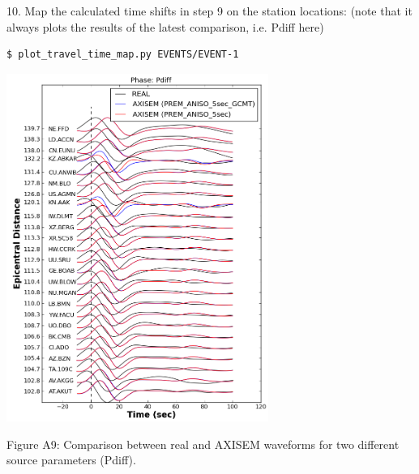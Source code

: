 \documentclass{article}
\begin{document}
\vspace{13pt}
10. Map the calculated time shifts in step 9 on the station locations: (note that 
it always plots the results of the latest comparison, i.e. Pdiff here) 

\begin{lstlisting}
$ plot_travel_time_map.py EVENTS/EVENT-1
\end{lstlisting}

\begin{center}
\includegraphics[width=242pt, height=322pt, keepaspectratio=true]{AXISEMTutorial-fig015.png}

{\small{}Figure A9: Comparison between real and AXISEM waveforms for two different 
source parameters (Pdiff).}


\end{center}
\end{document}
